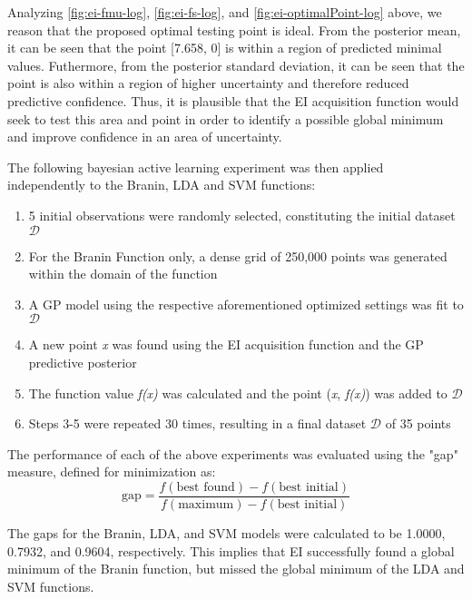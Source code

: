 \documentclass[11pt]{article}
\numberwithin{equation}{section}
\begin{document}
Analyzing \ref{fig:ei-fmu-log}, \ref{fig:ei-fs-log}, and \ref{fig:ei-optimalPoint-log} above, we reason that the proposed optimal testing point is ideal. 
From the posterior mean, it can be seen that the point [7.658, 0] is within a region of predicted minimal values.
Futhermore, from the posterior standard deviation, it can be seen that the point is also within a region of higher uncertainty and therefore reduced predictive confidence.
Thus, it is plausible that the EI acquisition function would seek to test this area and point in order to identify a possible global minimum and improve confidence in an area of uncertainty. 

The following bayesian active learning experiment was then applied independently to the Branin, LDA and SVM functions:
\begin{enumerate}
  \item 5 initial observations were randomly selected, constituting the initial dataset $\mathcal{D}$
  \item For the Branin Function only, a dense grid of 250,000 points was generated within the domain of the function
  \item A GP model using the respective aforementioned optimized settings was fit to $\mathcal{D}$
  \item A new point \emph{x} was found using the EI acquisition function and the GP predictive posterior
  \item The function value \emph{f(x)} was calculated and the point (\emph{x}, \emph{f(x)}) was added to $\mathcal{D}$
  \item Steps 3-5 were repeated 30 times, resulting in a final dataset $\mathcal{D}$ of 35 points
\end{enumerate}

The performance of each of the above experiments was evaluated using the "gap" measure, defined for minimization as:
\begin{equation}
  \text{gap} = \dfrac{f(\text{best found}) - f(\text{best initial})}{f(\text{maximum}) - f(\text{best initial})}
  \label{eq:gap}
\end{equation}

The gaps for the Branin, LDA, and SVM models were calculated to be 1.0000, 0.7932, and 0.9604, respectively. 
This implies that EI successfully found a global minimum of the Branin function, but missed the global minimum of the LDA and SVM functions.
\end{document}
